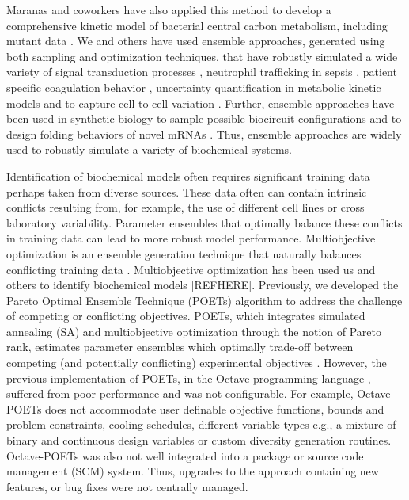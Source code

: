 \documentclass{bmcart}
\begin{document}
Maranas and coworkers have also applied this method to develop a comprehensive kinetic model of bacterial central carbon metabolism,
including mutant data \cite{Khodayari:2014aa}.
We and others have used ensemble approaches, generated using both sampling and optimization techniques,
that have robustly simulated a wide variety of signal transduction processes \citep{Luan:2007aa,Song:2009aa,Tasseff:2010aa,Tasseff:2011aa,Nayak:2011aa}, neutrophil trafficking in sepsis \cite{Song:2012aa},
patient specific coagulation behavior \cite{Luan:2010aa}, uncertainty quantification in metabolic kinetic models \cite{Andreozzi:2016aa} and to capture cell to cell variation \cite{Lequieu:2011aa}. Further, ensemble approaches have been used in synthetic biology to sample possible biocircuit configurations and to design folding behaviors of novel mRNAs \cite{Otero-Muras2014,Taneda2015}.
Thus, ensemble approaches are widely used to robustly simulate a variety of biochemical systems.

Identification of biochemical models often requires significant training data perhaps taken from diverse sources.
These data often can contain intrinsic conflicts resulting from, for example, the use of different cell lines or cross laboratory variability.
Parameter ensembles that optimally balance these conflicts in training data can lead to more robust model performance.
Multiobjective optimization is an ensemble generation technique that naturally balances conflicting training data \cite{Handl:2007aa}.
Multiobjective optimization has been used us and others to identify biochemical models [REFHERE].
Previously, we developed the Pareto Optimal Ensemble Technique (POETs) algorithm to address the challenge of competing or conflicting objectives.
POETs, which integrates simulated annealing (SA) and multiobjective optimization through the notion of Pareto rank, estimates parameter ensembles which optimally trade-off between
competing (and potentially conflicting) experimental objectives \cite{Song:2010aa}.
However, the previous implementation of POETs, in the Octave programming language \cite{CITE_Octave}, suffered from poor performance and was not configurable.
For example, Octave-POETs does not accommodate user definable objective functions, bounds and problem constraints, cooling schedules, different variable types e.g., a mixture of binary and continuous design variables or custom diversity generation routines. Octave-POETs was also not well integrated into a package or
source code management (SCM) system. Thus, upgrades to the approach containing new features, or bug fixes were not centrally managed.
\end{document}
